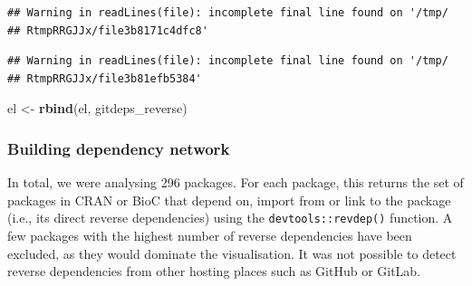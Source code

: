 \documentclass[]{article}
\newenvironment{Shaded}{\begin{snugshade}}{\end{snugshade}}
\newcommand{\DataTypeTok}[1]{\textcolor[rgb]{0.13,0.29,0.53}{#1}}
\newcommand{\KeywordTok}[1]{\textcolor[rgb]{0.13,0.29,0.53}{\textbf{#1}}}
\newcommand{\NormalTok}[1]{#1}
\newcommand{\OperatorTok}[1]{\textcolor[rgb]{0.81,0.36,0.00}{\textbf{#1}}}
\newcommand{\StringTok}[1]{\textcolor[rgb]{0.31,0.60,0.02}{#1}}
\begin{document}
\begin{Shaded}
\end{Shaded}

\begin{verbatim}
## Warning in readLines(file): incomplete final line found on '/tmp/
## RtmpRRGJJx/file3b8171c4dfc8'
\end{verbatim}

\begin{verbatim}
## Warning in readLines(file): incomplete final line found on '/tmp/
## RtmpRRGJJx/file3b81efb5384'
\end{verbatim}

\begin{Shaded}
\begin{Highlighting}[]
\NormalTok{el <-}\StringTok{ }\KeywordTok{rbind}\NormalTok{(el, gitdeps_reverse)}
\end{Highlighting}
\end{Shaded}

\hypertarget{building-dependency-network}{%
\subsubsection*{Building dependency network}\label{building-dependency-network}}

In total, we were analysing 296 packages.
For each package, this returns the set of packages in CRAN or BioC that depend on, import from or link to the package (i.e., its direct reverse dependencies) using the \texttt{devtools::revdep()} function. A few packages with the highest number of reverse dependencies have been excluded, as they would dominate the visualisation.
It was not possible to detect reverse dependencies from other hosting places such as GitHub or GitLab.
\end{document}
